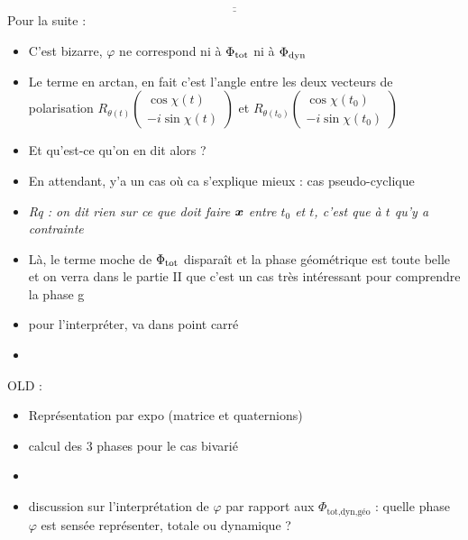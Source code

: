 \[\underline{\overline{\qquad\qquad\qquad\qquad\qquad\qquad\qquad\qquad\qquad\qquad\qquad\qquad}}\]
Pour la suite :
\begin{itemize}
	
	\item C'est bizarre, $\varphi$ ne correspond ni à $\Phi_{\text{\normalfont tot}}$ ni à $\Phi_{\text{\normalfont dyn}}$ 
	
	\item Le terme en arctan, en fait c'est l'angle entre les deux vecteurs de polarisation $R_{\theta(t)} \begin{pmatrix} \cos\chi(t) \\ -i\sin\chi(t) \end{pmatrix}$ et $R_{\theta(t_0)} \begin{pmatrix} \cos\chi(t_0) \\ -i\sin\chi(t_0) \end{pmatrix}$ 
	
	\item Et qu'est-ce qu'on en dit alors ?
	
	\item En attendant, y'a un cas où ca s'explique mieux : cas pseudo-cyclique
	
	\item \textit{Rq : on dit rien sur ce que doit faire $\boldsymbol{x}$ entre $t_0$ et $t$, c'est que à $t$ qu'y a contrainte}
	
	\item Là, le terme moche de $\Phi_{\text{\normalfont tot}}$ disparaît et la phase géométrique est toute belle et on verra dans le partie II que c'est un cas très intéressant pour comprendre la phase g
	
	\item  pour l'interpréter, va dans point carré
	
	\item {}
	
	
\end{itemize}

OLD : 
\begin{itemize}
	
	\item Représentation par expo (matrice et quaternions)
	
	\item calcul des 3 phases pour le cas bivarié
	
	\item {}
	
	\item discussion sur l'interprétation de $\varphi$ par rapport aux $\Phi_{\text{tot,dyn,géo}}$ : quelle phase $\varphi$ est sensée représenter, totale ou dynamique ?
		
\end{itemize}



